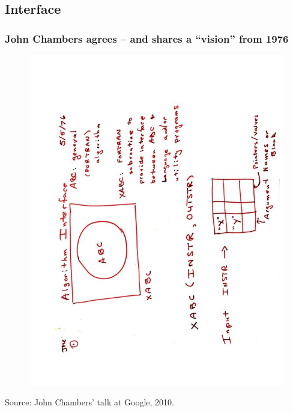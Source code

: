 \documentclass[dvipsnames,compress,pdflatex,beamer]{beamer}
\begin{document}
\subsection{Interface}
\begin{frame}
  \frametitle{John Chambers agrees -- and shares a ``vision'' from 1976}

  \begin{figure}
    \includegraphics[scale=0.3,angle=270]{images/Chambers2010_Page6.pdf}
  \end{figure}

  \medskip \footnotesize Source: John Chambers' talk at Google, 2010.
\end{frame}
\end{document}
